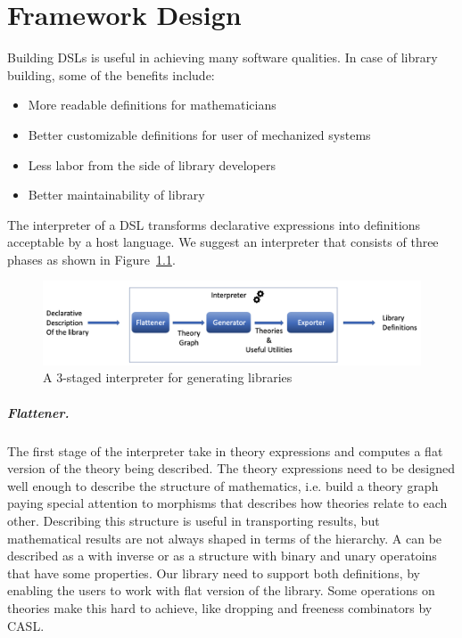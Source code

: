 \chapter{Framework Design}

Building DSLs is useful in achieving many software qualities. In case of library building, some of the benefits include:  
\begin{itemize}
    \item More readable definitions for mathematicians 
    \item Better customizable definitions for user of mechanized systems 
    \item Less labor from the side of library developers 
    \item Better maintainability of library 
\end{itemize}

The interpreter of a DSL transforms declarative expressions into definitions acceptable by a host language. We suggest an interpreter that consists of three phases as shown in Figure~\ref{fig:staged-interpreter}. 
\begin{figure}
\includegraphics[scale=0.5,width=\linewidth]{figures/interpreter_detailed}
\caption{A $3$-staged interpreter for generating libraries}
\label{fig:staged-interpreter}
\end{figure}

\paragraph{Flattener.} The first stage of the interpreter take in theory expressions and computes a flat version of the theory being described. The theory expressions need to be designed well enough to describe the structure of mathematics, i.e. build a theory graph paying special attention to morphisms that describes how theories relate to each other. Describing this structure is useful in transporting results, but mathematical results are not always shaped in terms of the hierarchy. A  can be described as a  with inverse or as a structure with binary and unary operatoins that have some properties. Our library need to support both definitions, by enabling the users to work with flat version of the library. Some operations on theories make this hard to achieve, like dropping and freeness combinators by CASL. 

